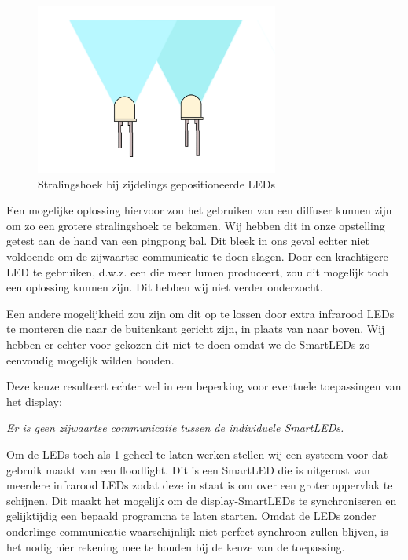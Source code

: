 \documentclass{article}
\begin{document}
\begin{figure}[H]
\centering
\includegraphics[width=8cm]{LedNaastElkaar.png}
\caption{Stralingshoek bij zijdelings gepositioneerde LEDs}
\label{fig:plaatsing}
\end{figure}

Een mogelijke oplossing hiervoor zou het gebruiken van een diffuser kunnen zijn om zo een grotere stralingshoek te bekomen. Wij hebben dit in onze opstelling getest aan de hand van een pingpong bal. Dit bleek in ons geval echter niet voldoende om de zijwaartse communicatie te doen slagen. Door een krachtigere LED te gebruiken, d.w.z. een die meer lumen produceert, zou dit mogelijk toch een oplossing kunnen zijn. Dit hebben wij niet verder onderzocht. 

Een andere mogelijkheid zou zijn om dit op te lossen door extra infrarood LEDs te monteren die naar de buitenkant gericht zijn, in plaats van naar boven. Wij hebben er echter voor gekozen dit niet te doen omdat we de SmartLEDs zo eenvoudig mogelijk wilden houden. 

Deze keuze resulteert echter wel in een beperking voor eventuele toepassingen van het display:
\medskip
\begin{displayquote}

 \textit{Er is geen zijwaartse communicatie tussen de individuele SmartLEDs.}
\end{displayquote}
\medskip

Om de LEDs toch als 1 geheel te laten werken stellen wij een systeem voor dat gebruik maakt van een floodlight. Dit is een SmartLED die is uitgerust van meerdere infrarood LEDs zodat deze in staat is om over een groter oppervlak te schijnen. Dit maakt het mogelijk om de display-SmartLEDs te synchroniseren en gelijktijdig een bepaald programma te laten starten. Omdat de LEDs zonder onderlinge communicatie waarschijnlijk niet perfect synchroon zullen blijven, is het nodig hier rekening mee te houden bij de keuze van de toepassing. 
\end{document}
